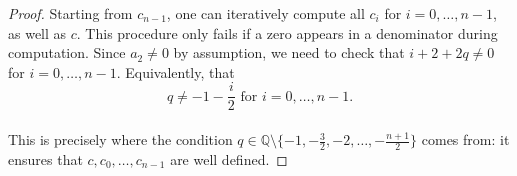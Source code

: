 \documentclass[10pt,a4paper]{amsart}
\begin{document}
\begin{proof}
Starting from $c_{n-1}$, one can iteratively compute all $c_i$ for $i=0,\ldots,n-1$, as well as $c$. This procedure only fails if a zero appears in a denominator during computation. Since $a_2 \neq 0$ by assumption, we need to check that $i + 2 + 2q \neq 0$ for $i=0,\ldots,n-1$. Equivalently, that
\[q \neq -1 - \frac{i}{2} \text{ for } i = 0,\ldots,n-1.\]
\\
This is precisely where the condition $q\in\mathbb{Q}\setminus\{-1,-\frac{3}{2},-2,\ldots,-\frac{n+1}{2}\}$ comes from: it ensures that $c, c_0, \ldots, c_{n-1}$ are well defined.
\end{proof}
\end{document}
